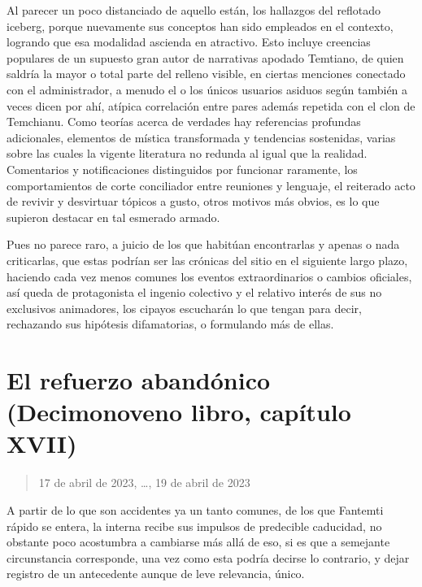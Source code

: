 \documentclass[
]{book}
\begin{document}
Al parecer un poco distanciado de aquello están, los hallazgos del reflotado iceberg, porque nuevamente sus conceptos han sido empleados en el contexto, logrando que esa modalidad ascienda en atractivo. Esto incluye creencias populares de un supuesto gran autor de narrativas apodado Temtiano, de quien saldría la mayor o total parte del relleno visible, en ciertas menciones conectado con el administrador, a menudo el o los únicos usuarios asiduos según también a veces dicen por ahí, atípica correlación entre pares además repetida con el clon de Temchianu. Como teorías acerca de verdades hay referencias profundas adicionales, elementos de mística transformada y tendencias sostenidas, varias sobre las cuales la vigente literatura no redunda al igual que la realidad. Comentarios y notificaciones distinguidos por funcionar raramente, los comportamientos de corte conciliador entre reuniones y lenguaje, el reiterado acto de revivir y desvirtuar tópicos a gusto, otros motivos más obvios, es lo que supieron destacar en tal esmerado armado.

Pues no parece raro, a juicio de los que habitúan encontrarlas y apenas o nada criticarlas, que estas podrían ser las crónicas del sitio en el siguiente largo plazo, haciendo cada vez menos comunes los eventos extraordinarios o cambios oficiales, así queda de protagonista el ingenio colectivo y el relativo interés de sus no exclusivos animadores, los cipayos escucharán lo que tengan para decir, rechazando sus hipótesis difamatorias, o formulando más de ellas.

\hypertarget{el-refuerzo-abanduxf3nico-decimonoveno-libro-capuxedtulo-xvii}{%
\section{El refuerzo abandónico (Decimonoveno libro, capítulo XVII)}\label{el-refuerzo-abanduxf3nico-decimonoveno-libro-capuxedtulo-xvii}}

\begin{quote}
17 de abril de 2023, \ldots, 19 de abril de 2023
\end{quote}

A partir de lo que son accidentes ya un tanto comunes, de los que Fantemti rápido se entera, la interna recibe sus impulsos de predecible caducidad, no obstante poco acostumbra a cambiarse más allá de eso, si es que a semejante circunstancia corresponde, una vez como esta podría decirse lo contrario, y dejar registro de un antecedente aunque de leve relevancia, único.
\end{document}
